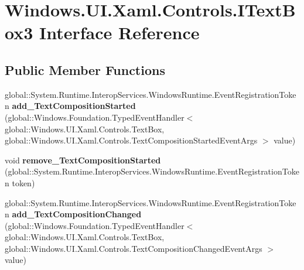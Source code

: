 \hypertarget{interface_windows_1_1_u_i_1_1_xaml_1_1_controls_1_1_i_text_box3}{}\section{Windows.\+U\+I.\+Xaml.\+Controls.\+I\+Text\+Box3 Interface Reference}
\label{interface_windows_1_1_u_i_1_1_xaml_1_1_controls_1_1_i_text_box3}
\subsection*{Public Member Functions}
\begin{DoxyCompactItemize}
\item 
\mbox{\label{interface_windows_1_1_u_i_1_1_xaml_1_1_controls_1_1_i_text_box3_ad4742435a40d61b4eacf33adf68ea53f}} 
global\+::\+System.\+Runtime.\+Interop\+Services.\+Windows\+Runtime.\+Event\+Registration\+Token {\bfseries add\+\_\+\+Text\+Composition\+Started} (global\+::\+Windows.\+Foundation.\+Typed\+Event\+Handler$<$ global\+::\+Windows.\+U\+I.\+Xaml.\+Controls.\+Text\+Box, global\+::\+Windows.\+U\+I.\+Xaml.\+Controls.\+Text\+Composition\+Started\+Event\+Args $>$ value)
\item 
\mbox{\label{interface_windows_1_1_u_i_1_1_xaml_1_1_controls_1_1_i_text_box3_a23f2d618ba42f695a3dbb9b869e8da34}} 
void {\bfseries remove\+\_\+\+Text\+Composition\+Started} (global\+::\+System.\+Runtime.\+Interop\+Services.\+Windows\+Runtime.\+Event\+Registration\+Token token)
\item 
\mbox{\label{interface_windows_1_1_u_i_1_1_xaml_1_1_controls_1_1_i_text_box3_ac0297f19faa2bba0bee10cc8a43661e3}} 
global\+::\+System.\+Runtime.\+Interop\+Services.\+Windows\+Runtime.\+Event\+Registration\+Token {\bfseries add\+\_\+\+Text\+Composition\+Changed} (global\+::\+Windows.\+Foundation.\+Typed\+Event\+Handler$<$ global\+::\+Windows.\+U\+I.\+Xaml.\+Controls.\+Text\+Box, global\+::\+Windows.\+U\+I.\+Xaml.\+Controls.\+Text\+Composition\+Changed\+Event\+Args $>$ value)
\item 
\mbox{\label{interface_windows_1_1_u_i_1_1_xaml_1_1_controls_1_1_i_text_box3_a534bf7d3625db3f5d85c0082e35b4b68}} 

\end{DoxyCompactItemize}
